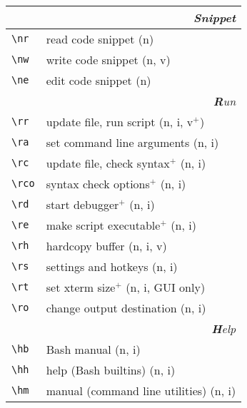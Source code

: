 \documentclass[oneside,12pt,a4paper,DIV18]{scrartcl}
\begin{document}
\begin{center}
\newpage 
\begin{tabular}[]{l}
   \\ [35.4ex]								%
\end{tabular} \\ 
\begin{tabular}[]{|p{11mm}|p{59mm}|}
\hline
\multicolumn{2}{|r|}{\textsl{S\textbf{n}ippet}} \\
\hline \verb'\nr'  & read code snippet          \hfill (n)\\
\hline \verb'\nw'  & write code snippet         \hfill (n, v)\\
\hline \verb'\ne'  & edit code snippet          \hfill (n)\\
\hline
\hline
\multicolumn{2}{|r|}{\textsl{\textbf{R}un}} \\
\hline \verb'\rr'  & update file, run script    		\hfill (n, i, v$^+$)\\
\hline \verb'\ra'  & set command line arguments 		\hfill (n, i)\\
\hline \verb'\rc'  & update file, check syntax$^+$  \hfill (n, i)\\
\hline \verb'\rco' & syntax check options$^+$       \hfill (n, i)\\
\hline \verb'\rd'  & start debugger$^+$             \hfill (n, i)\\
\hline \verb'\re'  & make script executable$^+$     \hfill (n, i)\\
\hline \verb'\rh'  & hardcopy buffer            		\hfill (n, i, v)\\
\hline \verb'\rs'  & settings and hotkeys       		\hfill (n, i)\\
\hline \verb'\rt'  & set xterm size$^+$             \hfill (n, i, GUI only)\\
\hline \verb'\ro'  & change output destination  		\hfill (n, i)\\
\hline
\hline 
\multicolumn{2}{|r|}{\textsl{\textbf{H}elp}} \\
\hline \verb'\hb'  & Bash manual                     \hfill (n, i) \\
\hline \verb'\hh'  & help (Bash builtins)            \hfill (n, i) \\
\hline \verb'\hm'  & manual (command line utilities) \hfill (n, i) \\

\end{tabular}
\end{center}
\end{document}
